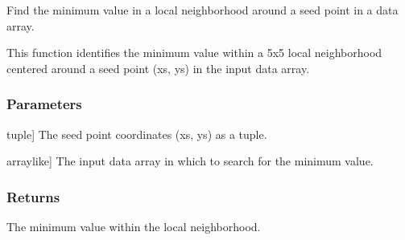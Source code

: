 \documentclass[letterpaper,10pt,english]{sphinxmanual}
\begin{document}
\begin{fulllineitems}
\label{\detokenize{pycatch/utils/ch_mapping:pycatch.utils.ch_mapping.min_picker}}
\pysigstartsignatures
{}
\pysigstopsignatures
\sphinxAtStartPar
Find the minimum value in a local neighborhood around a seed point in a data array.

\sphinxAtStartPar
This function identifies the minimum value within a 5x5 local neighborhood centered around a seed point (xs, ys)
in the input data array.


\subsubsection{Parameters}
\label{\detokenize{pycatch/utils/ch_mapping:id25}}\begin{description}
\sphinxlineitem{seed}{[}tuple{]}
\sphinxAtStartPar
The seed point coordinates (xs, ys) as a tuple.

\sphinxlineitem{data}{[}array\sphinxhyphen{}like{]}
\sphinxAtStartPar
The input data array in which to search for the minimum value.

\end{description}


\subsubsection{Returns}
\label{\detokenize{pycatch/utils/ch_mapping:id26}}\begin{description}
\sphinxAtStartPar
The minimum value within the local neighborhood.

\end{description}

\end{fulllineitems}

\end{document}
